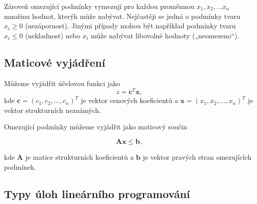 Zároveň omezující podmínky vymezují pro každou proměnnou $x_1, x_2, \ldots x_n$ množinu hodnot, kterýh může nabývat. 
Nejčastěji se jedná o podmínky tvaru $x_i \geq 0$ (nezápornost).
Jinými případy mohou být například podmínky tvaru $x_i \leq 0$ (nekladnost) nebo $x_i$ může nabývat libovolné hodnoty („neomezeno“).

\subsection{Maticové vyjádření}

Můžeme vyjádřit účelovou funkci jako $$ z = \bm{c}^T\bm{x} ,$$
kde $\bm{c} = (c_1, c_2, \ldots, c_n)^T$ je vektor cenových koeficientů a $\bm{x} = (x_1, x_2, \ldots, x_n)^T$ je vektor strukturních neznámých.

Omezující podmínky můžeme vyjádřit jako maticový součin

$$ \bm{A}\bm{x} \leq \bm{b} ,$$

kde $\bm{A}$ je matice strukturních koeficientů a $\bm{b}$ je vektor pravých stran omezujících podmínek.

\subsection{Typy úloh lineárního programování}